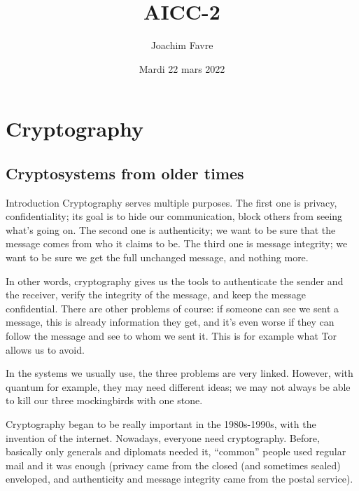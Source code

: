 \documentclass[a4paper]{article}
\title{AICC-2}
\author{Joachim Favre}
\date{Mardi 22 mars 2022}
\begin{document}
\maketitle


\section{Cryptography}
\subsection{Cryptosystems from older times}
\begin{parag}{Introduction}
    Cryptography serves multiple purposes. The first one is privacy, confidentiality; its goal is to hide our communication, block others from seeing what's going on. The second one is authenticity; we want to be sure that the message comes from who it claims to be. The third one is message integrity; we want to be sure we get the full unchanged message, and nothing more.

    In other words, cryptography gives us the tools to authenticate the sender and the receiver, verify the integrity of the message, and keep the message confidential. There are other problems of course: if someone can see we sent a message, this is already information they get, and it's even worse if they can follow the message and see to whom we sent it. This is for example what Tor allows us to avoid.

    In the systems we usually use, the three problems are very linked. However, with quantum for example, they may need different ideas; we may not always be able to kill our three mockingbirds with one stone.

    Cryptography began to be really important in the 1980s-1990s, with the invention of the internet. Nowadays, everyone need cryptography. Before, basically only generals and diplomats needed it, ``common'' people used regular mail and it was enough (privacy came from the closed (and sometimes sealed) enveloped, and authenticity and message integrity came from the postal service).
\end{parag}
\end{document}

